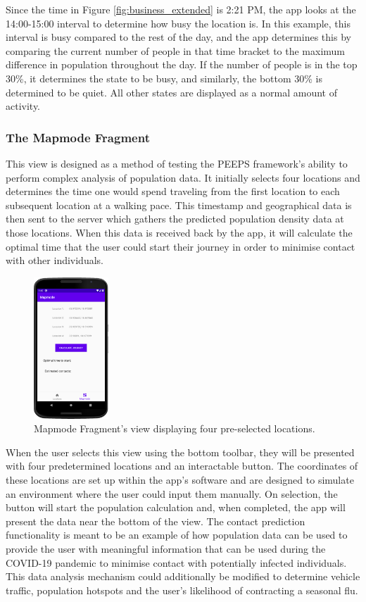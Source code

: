 Since the time in Figure \ref{fig:business_extended} is 2:21 PM, the app looks at the 14:00-15:00 interval to determine how busy the location is. In this example, this interval is busy compared to the rest of the day, and the app determines this by comparing the current number of people in that time bracket to the maximum difference in population throughout the day. If the number of people is in the top 30\%, it determines the state to be busy, and similarly, the bottom 30\% is determined to be quiet. All other states are displayed as a normal amount of activity. 

\subsubsection{The Mapmode Fragment}

This view is designed as a method of testing the PEEPS framework's ability to perform complex analysis of population data. It initially selects four locations and determines the time one would spend traveling from the first location to each subsequent location at a walking pace. This timestamp and geographical data is then sent to the server which gathers the predicted population density data at those locations. When this data is received back by the app, it will calculate the optimal time that the user could start their journey in order to minimise contact with other individuals.

\begin{figure}[ht]
    \centering
    \includegraphics[width=0.25\textwidth]{figures/MapmodeDesign.png}
    \caption{Mapmode Fragment's view displaying four pre-selected locations.}
    \label{fig:mapmode_design}
\end{figure}

When the user selects this view using the bottom toolbar, they will be presented with four predetermined locations and an interactable button. The coordinates of these locations are set up within the app's software and are designed to simulate an environment where the user could input them manually. On selection, the button will start the population calculation and, when completed, the app will present the data near the bottom of the view. The contact prediction functionality is meant to be an example of how population data can be used to provide the user with meaningful information that can be used during the COVID-19 pandemic to minimise contact with potentially infected individuals. This data analysis mechanism could additionally be modified to determine vehicle traffic, population hotspots and the user's likelihood of contracting a seasonal flu.

